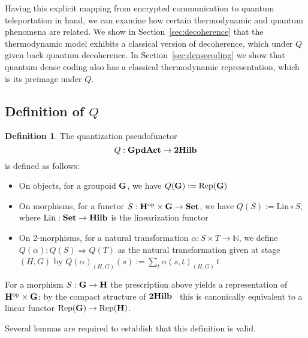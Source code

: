 \documentclass[a4paper,12pt]{article}
\theoremstyle{definition}
\newtheorem{defn}[theorem]{Definition}
\newcommand\cat[1]{{\ensuremath{\bf #1}}}
\newcommand\N{\ensuremath{\mathbb{N}}}
\renewcommand{\-}[0]{\nobreakdash-\hspace{0pt}}
\newcommand\op{\ensuremath{\mathrm{op}}}
\newcommand\Rep{\ensuremath{\mathrm{Rep}}}
\newcommand\Lin{\ensuremath{\mathrm{Lin}}}
\newcommand\GA{\cat{GpdAct}{}}
\begin{document}
Having this explicit mapping from encrypted communication to quantum teleportation in hand, we can examine how certain thermodynamic and quantum phenomena are related. We show in Section~\ref{sec:decoherence} that the thermodynamic model exhibits a classical version of decoherence, which under $Q$ given back quantum decoherence. In Section~\ref{sec:densecoding} we show that quantum dense coding also has a classical thermodynamic representation, which is its preimage under $Q$.

\subsection{Definition of $Q$}
\label{sec:definitionQ}

\begin{defn}
The quantization pseudofunctor$$Q : \GA \to \cat{2Hilb}$$ is defined as follows:
\begin{itemize}
\item On objects, for a groupoid \cat G, we have $Q(\cat G) := \Rep(\cat G)$
\item On morphisms, for a functor $S: \cat H ^\op \times \cat G \to \cat{Set}$, we have $Q(S) := \Lin \circ S$, where $\Lin:\cat{Set} \to \cat{Hilb}$ is the linearization functor
\item On 2-morphisms, for a natural transformation \mbox{$\alpha: S \times T \to \N$}, we define \mbox{$Q(\alpha):Q(S) \Rightarrow Q(T)$} as the natural transformation given at stage $(H,G)$ by  $Q(\alpha) _{(H,G)}(s) := \sum_t \alpha(s,t) _{(H,G)} \, t$
\end{itemize}
\end{defn}

\noindent
For a morphism $S:\cat G \to \cat H$ the prescription above yields a representation of $\cat H ^\op \times \cat G$; by the compact structure of \cat{2Hilb}~\cite{b97-hda2} this is canonically equivalent to a linear functor $\Rep(\cat G) \to \Rep(\cat H)$.

Several lemmas are required to establish that this definition is valid.
\end{document}
